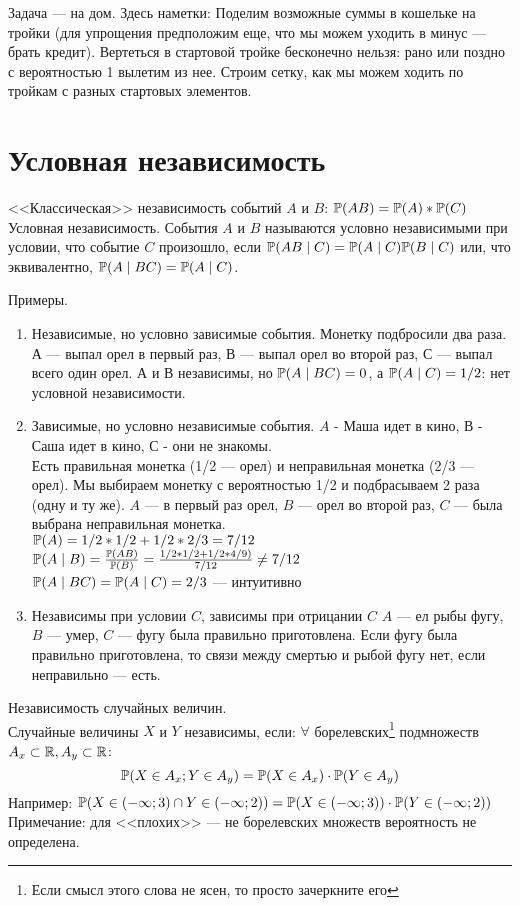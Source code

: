 Задача --- на дом. Здесь наметки:
Поделим возможные суммы в кошельке на тройки (для упрощения предположим еще, что мы можем уходить в минус --- брать кредит). Вертеться в стартовой тройке бесконечно нельзя: рано или поздно с вероятностью 1 вылетим из нее. Строим сетку, как мы можем ходить по тройкам с разных стартовых элементов. 

\section{Условная независимость}

<<Классическая>> независимость событий $A$ и $B$: $\P(AB)=\P(A)*\P(C)$
Условная независимость. События $A$ и $B$ называются условно независимыми при условии, что событие $C$ произошло, если $\P(AB \mid C)=\P(A \mid C)\P(B \mid C)$ или, что эквивалентно, $\P(A\mid BC)=\P(A\mid C)$. 

Примеры.
\begin{enumerate}
\item Независимые, но условно зависимые события.
Монетку подбросили два раза. $А$ --- выпал орел в первый раз, $В$ --- выпал орел во второй раз, $С$ --- выпал всего один орел. $А$ и $В$ независимы, но $\P(A\mid BC)=0$, а $\P(A\mid C)=1/2$: нет условной независимости.
\item Зависимые, но условно независимые события.
$A$ - Маша идет в кино, $В$ - Саша идет в кино, $С$ - они не знакомы.\\

Есть правильная монетка (1/2 --- орел) и неправильная монетка (2/3 --- орел). Мы выбираем монетку с вероятностью 1/2 и подбрасываем 2 раза (одну и ту же). $A$ --- в первый раз орел, $B$ --- орел во второй раз, $C$ --- была выбрана неправильная монетка.\\
$\P(A)=1/2*1/2+1/2*2/3=7/12$\\
$\P(A\mid B)=\frac{\P(AB)}{\P(B)}=\frac{1/2*1/2+1/2*4/9)}{7/12} \not = 7/12$\\
$\P(A\mid BC)=\P(A\mid C)=2/3$ --- интуитивно
\item Независимы при условии $C$, зависимы при отрицании $C$
$A$ --- ел рыбы фугу, $B$ --- умер, $C$ --- фугу была правильно приготовлена.
Если фугу была правильно приготовлена, то связи между смертью и рыбой фугу нет, если неправильно --- есть.
\end{enumerate}

Независимость случайных величин.\\
Случайные величины $X$ и $Y$ независимы, если:
$\forall$ борелевских\footnote{Если смысл этого слова не ясен, то просто зачеркните его}  подмножеств $A_x\subset\R, A_y\subset\R$:
 \begin{equation}
\P(X\in A_x;Y\in A_y)=\P(X\in A_x)\cdot \P(Y\in A_y)
\end{equation}
Например: $\P(X\in(-\infty;3)\cap Y\in (-\infty; 2))=\P(X \in (-\infty;3))\cdot \P(Y \in (-\infty;2))$
Примечание: для <<плохих>> --- не борелевских множеств вероятность не определена. 

